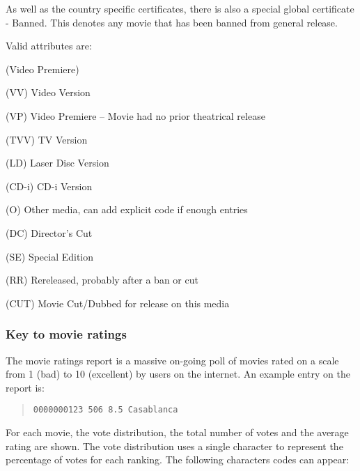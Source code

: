 \vspace{4mm}
As well as the country specific certificates, there is also a special
global certificate - Banned. This denotes any movie that has
been banned from general release.

\vspace{4mm}
Valid attributes are:

\vspace{2mm}
\begin{Ventry}{(Video Premiere)}
         \item[(VV)]         Video Version
         \item[(VP)]         Video Premiere -- Movie had no prior theatrical release
         \item[(TVV)]       TV Version
         \item[(LD)]         Laser Disc Version
         \item[(CD-i)]       CD-i Version
         \item[(O)]          Other media, can add explicit code if enough entries

         \item[(DC)]         Director's Cut
         \item[(SE)]         Special Edition
         \item[(RR)]         Rereleased, probably after a ban or cut
         \item[(CUT)]        Movie Cut/Dubbed for release on this media
\end{Ventry}      
   
\subsubsection{Key to movie ratings}

The movie ratings report is a massive on-going poll of movies rated on a scale
from 1 (bad) to 10 (excellent) by users on the internet. An example entry on
the report is:
\begin{quote}
{\tt 0000000123     506   8.5  Casablanca}
\end{quote}
     
For each movie, the vote distribution, the total number of votes and the 
average rating are shown. The vote distribution uses a single character to 
represent the percentage of votes for each ranking.  The following characters
codes can appear:

